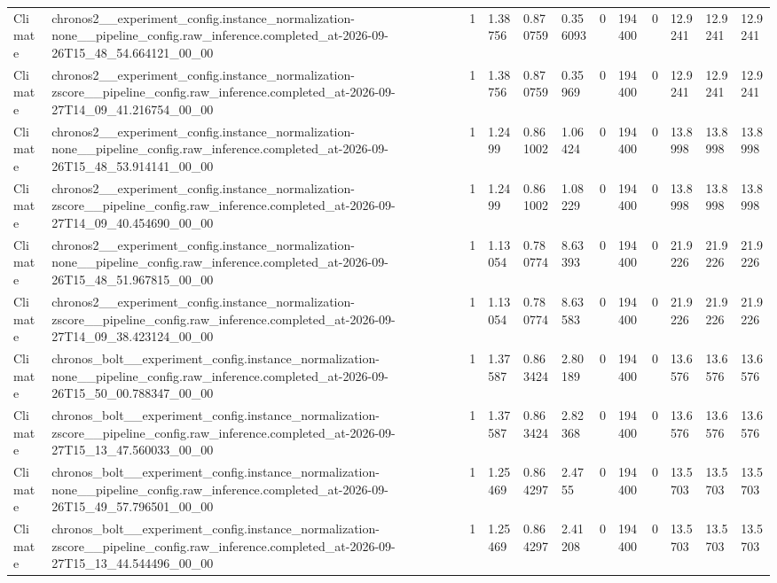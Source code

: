 \begin{tabular}{llllllllllll}
Climate & chronos2\_\_experiment\_config.instance\_normalization-none\_\_pipeline\_config.raw\_inference.completed\_at-2026-09-26T15\_48\_54.664121\_00\_00 & 1 & 1.38756 & 0.870759 & 0.356093 & 0 & 194400 & 0 & 12.9241 & 12.9241 & 12.9241 \\
Climate & chronos2\_\_experiment\_config.instance\_normalization-zscore\_\_pipeline\_config.raw\_inference.completed\_at-2026-09-27T14\_09\_41.216754\_00\_00 & 1 & 1.38756 & 0.870759 & 0.35969 & 0 & 194400 & 0 & 12.9241 & 12.9241 & 12.9241 \\
Climate & chronos2\_\_experiment\_config.instance\_normalization-none\_\_pipeline\_config.raw\_inference.completed\_at-2026-09-26T15\_48\_53.914141\_00\_00 & 1 & 1.2499 & 0.861002 & 1.06424 & 0 & 194400 & 0 & 13.8998 & 13.8998 & 13.8998 \\
Climate & chronos2\_\_experiment\_config.instance\_normalization-zscore\_\_pipeline\_config.raw\_inference.completed\_at-2026-09-27T14\_09\_40.454690\_00\_00 & 1 & 1.2499 & 0.861002 & 1.08229 & 0 & 194400 & 0 & 13.8998 & 13.8998 & 13.8998 \\
Climate & chronos2\_\_experiment\_config.instance\_normalization-none\_\_pipeline\_config.raw\_inference.completed\_at-2026-09-26T15\_48\_51.967815\_00\_00 & 1 & 1.13054 & 0.780774 & 8.63393 & 0 & 194400 & 0 & 21.9226 & 21.9226 & 21.9226 \\
Climate & chronos2\_\_experiment\_config.instance\_normalization-zscore\_\_pipeline\_config.raw\_inference.completed\_at-2026-09-27T14\_09\_38.423124\_00\_00 & 1 & 1.13054 & 0.780774 & 8.63583 & 0 & 194400 & 0 & 21.9226 & 21.9226 & 21.9226 \\
Climate & chronos\_bolt\_\_experiment\_config.instance\_normalization-none\_\_pipeline\_config.raw\_inference.completed\_at-2026-09-26T15\_50\_00.788347\_00\_00 & 1 & 1.37587 & 0.863424 & 2.80189 & 0 & 194400 & 0 & 13.6576 & 13.6576 & 13.6576 \\
Climate & chronos\_bolt\_\_experiment\_config.instance\_normalization-zscore\_\_pipeline\_config.raw\_inference.completed\_at-2026-09-27T15\_13\_47.560033\_00\_00 & 1 & 1.37587 & 0.863424 & 2.82368 & 0 & 194400 & 0 & 13.6576 & 13.6576 & 13.6576 \\
Climate & chronos\_bolt\_\_experiment\_config.instance\_normalization-none\_\_pipeline\_config.raw\_inference.completed\_at-2026-09-26T15\_49\_57.796501\_00\_00 & 1 & 1.25469 & 0.864297 & 2.4755 & 0 & 194400 & 0 & 13.5703 & 13.5703 & 13.5703 \\
Climate & chronos\_bolt\_\_experiment\_config.instance\_normalization-zscore\_\_pipeline\_config.raw\_inference.completed\_at-2026-09-27T15\_13\_44.544496\_00\_00 & 1 & 1.25469 & 0.864297 & 2.41208 & 0 & 194400 & 0 & 13.5703 & 13.5703 & 13.5703 \\

\end{tabular}
